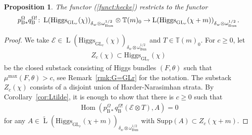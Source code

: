 \documentclass [11pt,oneside,a4paper,mathscr]{amsart}
\newtheorem{prop}[thm]{Proposition}
\theoremstyle{definition}
\renewcommand{\geq}{\geqslant}
\newcommand{\LL}{\operatorname{L}}
\newcommand{\Hom}{\operatorname{Hom}}
\newcommand{\GL}{\operatorname{GL}}
\newcommand{\Hig}{\mathrm{Higgs}}
\newcommand{\Bun}{\mathrm{Bun}}
\begin{document}
\begin{prop}\label{prop:hecke2}
    The functor (\ref{funct:hecke}) restricts to the functor 
\begin{align}\notag
p_{\mathrm{B}\ast}^{\Omega} q_{\mathrm{B}}^{\Omega!} \colon \LL(\Hig_{\GL_r}(\chi))_{\delta_w \otimes \omega_{\Bun}^{1/2}} \otimes \mathbb{T}(m)_0
\to \LL(\Hig_{\GL_r}(\chi+m))_{\delta_w\otimes \omega_{\Bun}^{1/2}}.
    \end{align}
    \end{prop}
    \begin{proof}
We take $\mathcal{E} \in \LL(\Hig_{\GL_r}(\chi))_{\delta_w\otimes \omega_{\Bun}^{1/2}}$ and $T\in \mathbb{T}(m)_0$. 
For $c\geq 0$, let \begin{align*}Z_c(\chi) \subset \Hig_{\GL_r}(\chi)\end{align*}
be the closed substack consisting of Higgs bundles $(F, \theta)$ such that $\mu^{\mathrm{max}}(F, \theta)>c$, see Remark~\ref{rmk:G=GLr} for the notation. 
The substack $Z_c(\chi)$ consists of a disjoint union of Harder-Narasimhan strata. 
By Corollary~\ref{cor:Ltilde}, it is enough to show that 
there is $c \geq 0$ such that 
\begin{align}\label{ETA:0}
    \Hom(p_{\mathrm{B}\ast}^{\Omega}q_{\mathrm{B}}^{\Omega!}(\mathcal{E}\otimes T), A)=0
\end{align}
for any $A \in \widetilde{\LL}(\Hig_{\GL_r}(\chi+m))_{\delta_w\otimes \omega_{\Bun}^{1/2}}$ with
$\mathrm{Supp}(A) \subset Z_c(\chi+m)$. 


\end{proof}
\end{document}
